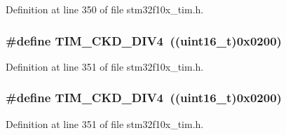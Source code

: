 Definition at line 350 of file stm32f10x\+\_\+tim.\+h.

\subsubsection[{\texorpdfstring{T\+I\+M\+\_\+\+C\+K\+D\+\_\+\+D\+I\+V4}{TIM_CKD_DIV4}}]{\setlength{\rightskip}{0pt plus 5cm}\#define T\+I\+M\+\_\+\+C\+K\+D\+\_\+\+D\+I\+V4~(({\bf uint16\+\_\+t})0x0200)}\hypertarget{group___t_i_m___clock___division___c_k_d_gac2e5c030f964f9b4c92fa8129fb923bc}{}\label{group___t_i_m___clock___division___c_k_d_gac2e5c030f964f9b4c92fa8129fb923bc}


Definition at line 351 of file stm32f10x\+\_\+tim.\+h.

\subsubsection[{\texorpdfstring{T\+I\+M\+\_\+\+C\+K\+D\+\_\+\+D\+I\+V4}{TIM_CKD_DIV4}}]{\setlength{\rightskip}{0pt plus 5cm}\#define T\+I\+M\+\_\+\+C\+K\+D\+\_\+\+D\+I\+V4~(({\bf uint16\+\_\+t})0x0200)}\hypertarget{group___t_i_m___clock___division___c_k_d_gac2e5c030f964f9b4c92fa8129fb923bc}{}\label{group___t_i_m___clock___division___c_k_d_gac2e5c030f964f9b4c92fa8129fb923bc}


Definition at line 351 of file stm32f10x\+\_\+tim.\+h.

